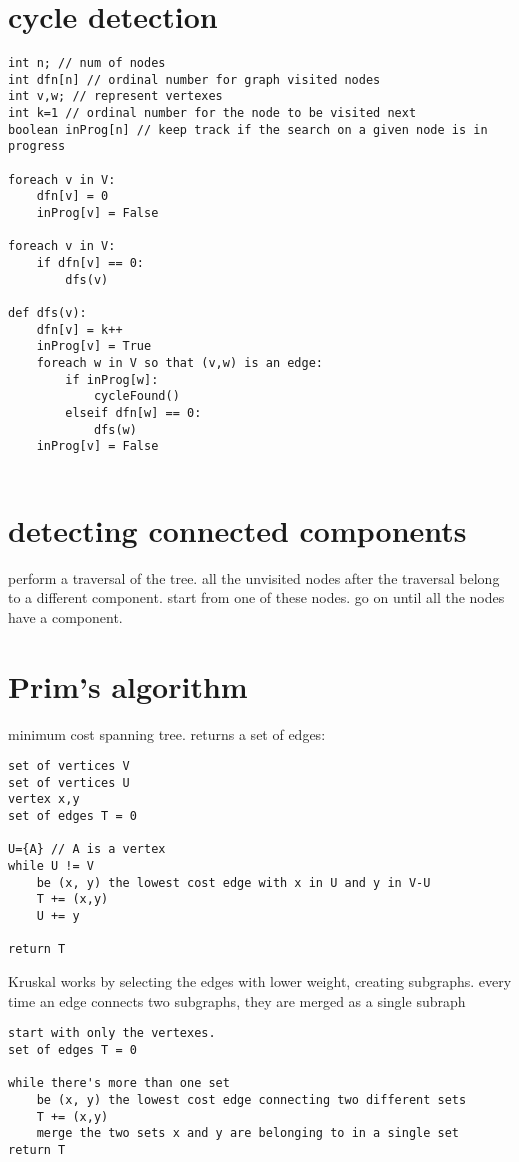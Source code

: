 \section{cycle detection}

\begin{verbatim}
int n; // num of nodes
int dfn[n] // ordinal number for graph visited nodes
int v,w; // represent vertexes
int k=1 // ordinal number for the node to be visited next
boolean inProg[n] // keep track if the search on a given node is in progress

foreach v in V:
    dfn[v] = 0
    inProg[v] = False

foreach v in V:
    if dfn[v] == 0:
        dfs(v)

def dfs(v):
    dfn[v] = k++
    inProg[v] = True
    foreach w in V so that (v,w) is an edge:
        if inProg[w]:
            cycleFound()
        elseif dfn[w] == 0:
            dfs(w)
    inProg[v] = False


\end{verbatim}

\section{detecting connected components}

perform a traversal of the tree. all the unvisited nodes after the traversal
belong to a different component. start from one of these nodes. go on until
all the nodes have a component.

\section{Prim's algorithm}

minimum cost spanning tree. returns a set of edges:

\begin{verbatim}
set of vertices V
set of vertices U
vertex x,y
set of edges T = 0

U={A} // A is a vertex
while U != V
    be (x, y) the lowest cost edge with x in U and y in V-U
    T += (x,y)
    U += y
    
return T
\end{verbatim}

Kruskal works by selecting the edges with lower weight, creating subgraphs.
every time an edge connects two subgraphs, they are merged as a single
subraph

\begin{verbatim}
start with only the vertexes.
set of edges T = 0

while there's more than one set
    be (x, y) the lowest cost edge connecting two different sets
    T += (x,y)
    merge the two sets x and y are belonging to in a single set
return T
\end{verbatim}


